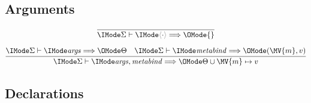 \documentclass{article}
\begin{document}
\subsection*{Arguments\hfill \framebox{$\Elab{\Sigma}{\SortArgs}{\Theta}$}}

\begin{gather}
  \infer{
    \Elab{\Sigma}{\EmptyCtx}{\{\}}
  }{
  }\\[6pt]
  \infer{
    \Elab{\Sigma}{\ExtendCtx{\SortArgs}{\SortMetaBind}}{
      \Theta\cup{\MV{m} \mapsto v}
    }
  }{
    \Elab{\Sigma}{\SortArgs}{\Theta} &
    \Elab{\Sigma}{\SortMetaBind}{(\MV{m}, v)}
  }
\end{gather}

\subsection*{Declarations\hfill {}}
\end{document}
